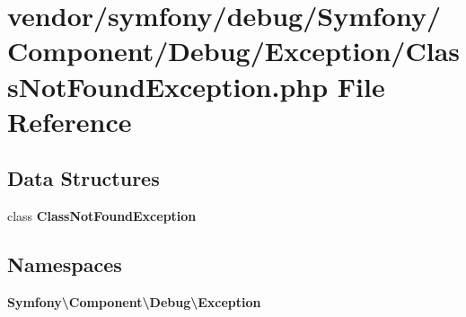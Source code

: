 \section{vendor/symfony/debug/\+Symfony/\+Component/\+Debug/\+Exception/\+Class\+Not\+Found\+Exception.php File Reference}
\label{symfony_2debug_2_symfony_2_component_2_debug_2_exception_2_class_not_found_exception_8php}
\subsection*{Data Structures}
\begin{DoxyCompactItemize}
\item 
class {\bf Class\+Not\+Found\+Exception}
\end{DoxyCompactItemize}
\subsection*{Namespaces}
\begin{DoxyCompactItemize}
\item 
 {\bf Symfony\textbackslash{}\+Component\textbackslash{}\+Debug\textbackslash{}\+Exception}
\end{DoxyCompactItemize}

